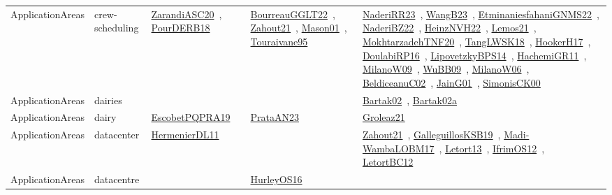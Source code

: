 {\begin{longtable}{lp{3cm}>{\raggedright\arraybackslash}p{6cm}>{\raggedright\arraybackslash}p{6cm}>{\raggedright\arraybackslash}p{8cm}}
ApplicationAreas & crew-scheduling & \href{works/ZarandiASC20.pdf}{ZarandiASC20}~\cite{ZarandiASC20}, \href{works/PourDERB18.pdf}{PourDERB18}~\cite{PourDERB18} & \href{works/BourreauGGLT22.pdf}{BourreauGGLT22}~\cite{BourreauGGLT22}, \href{works/Zahout21.pdf}{Zahout21}~\cite{Zahout21}, \href{works/Mason01.pdf}{Mason01}~\cite{Mason01}, \href{works/Touraivane95.pdf}{Touraivane95}~\cite{Touraivane95} & \href{works/NaderiRR23.pdf}{NaderiRR23}~\cite{NaderiRR23}, \href{works/WangB23.pdf}{WangB23}~\cite{WangB23}, \href{works/EtminaniesfahaniGNMS22.pdf}{EtminaniesfahaniGNMS22}~\cite{EtminaniesfahaniGNMS22}, \href{works/NaderiBZ22.pdf}{NaderiBZ22}~\cite{NaderiBZ22}, \href{works/HeinzNVH22.pdf}{HeinzNVH22}~\cite{HeinzNVH22}, \href{works/Lemos21.pdf}{Lemos21}~\cite{Lemos21}, \href{works/MokhtarzadehTNF20.pdf}{MokhtarzadehTNF20}~\cite{MokhtarzadehTNF20}, \href{works/TangLWSK18.pdf}{TangLWSK18}~\cite{TangLWSK18}, \href{works/HookerH17.pdf}{HookerH17}~\cite{HookerH17}, \href{works/DoulabiRP16.pdf}{DoulabiRP16}~\cite{DoulabiRP16}, \href{works/LipovetzkyBPS14.pdf}{LipovetzkyBPS14}~\cite{LipovetzkyBPS14}, \href{works/HachemiGR11.pdf}{HachemiGR11}~\cite{HachemiGR11}, \href{works/MilanoW09.pdf}{MilanoW09}~\cite{MilanoW09}, \href{works/WuBB09.pdf}{WuBB09}~\cite{WuBB09}, \href{works/MilanoW06.pdf}{MilanoW06}~\cite{MilanoW06}, \href{works/BeldiceanuC02.pdf}{BeldiceanuC02}~\cite{BeldiceanuC02}, \href{works/JainG01.pdf}{JainG01}~\cite{JainG01}, \href{works/SimonisCK00.pdf}{SimonisCK00}~\cite{SimonisCK00}\\
ApplicationAreas & dairies &  &  & \href{works/Bartak02.pdf}{Bartak02}~\cite{Bartak02}, \href{works/Bartak02a.pdf}{Bartak02a}~\cite{Bartak02a}\\
ApplicationAreas & dairy & \href{works/EscobetPQPRA19.pdf}{EscobetPQPRA19}~\cite{EscobetPQPRA19} & \href{works/PrataAN23.pdf}{PrataAN23}~\cite{PrataAN23} & \href{works/Groleaz21.pdf}{Groleaz21}~\cite{Groleaz21}\\
ApplicationAreas & datacenter & \href{works/HermenierDL11.pdf}{HermenierDL11}~\cite{HermenierDL11} &  & \href{works/Zahout21.pdf}{Zahout21}~\cite{Zahout21}, \href{works/GalleguillosKSB19.pdf}{GalleguillosKSB19}~\cite{GalleguillosKSB19}, \href{works/Madi-WambaLOBM17.pdf}{Madi-WambaLOBM17}~\cite{Madi-WambaLOBM17}, \href{works/Letort13.pdf}{Letort13}~\cite{Letort13}, \href{works/IfrimOS12.pdf}{IfrimOS12}~\cite{IfrimOS12}, \href{works/LetortBC12.pdf}{LetortBC12}~\cite{LetortBC12}\\
ApplicationAreas & datacentre &  & \href{works/HurleyOS16.pdf}{HurleyOS16}~\cite{HurleyOS16} & \\

\end{longtable}}
